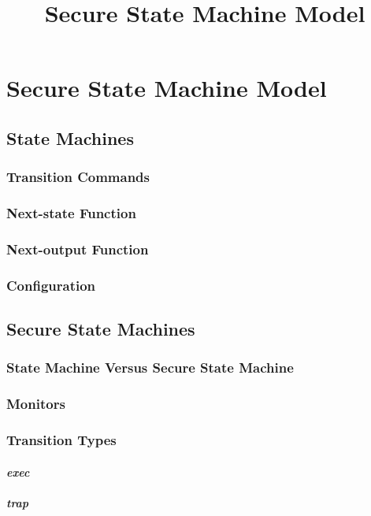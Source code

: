 \documentclass[../../main/main.tex]{subfiles}
\begin{document}
\title{Secure State Machine Model}

\chapter{Secure State Machine Model}\label{chp:ssmmodel}

\section{State Machines}\label{sec:sm}
\subsection{Transition Commands}
\subsection{Next-state Function}
\subsection{Next-output Function}
\subsection{Configuration}

\section{Secure State Machines}\label{sec:ssm}

\subsection{State Machine Versus Secure State Machine}
\subsection{Monitors}\label{monitors}
\subsection{Transition Types}
\subsubsection{\textit{exec}}
\subsubsection{\textit{trap}}
\end{document}
